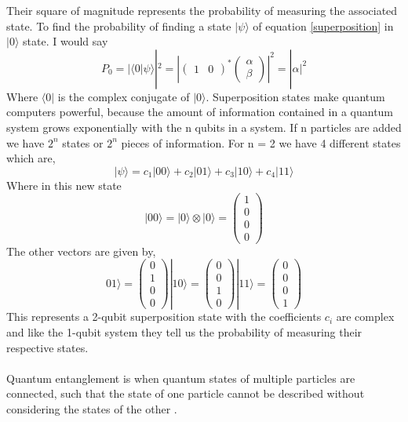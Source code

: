 \documentclass{Assignment}
\begin{document}
Their square of magnitude represents the probability of measuring the associated state.
To find the probability of finding a state $|\psi\rangle$ of equation \eqref{superposition} in $|0\rangle$ state.
I would say
$$P_0=|\langle0|\psi\rangle|^2 = \left| \begin{pmatrix}
	1&0
\end{pmatrix}^*\begin{pmatrix}
	\alpha\\\beta
\end{pmatrix} \right|^2 = |\alpha|^2$$
Where $\langle 0|$ is the complex conjugate of $|0\rangle$.
Superposition states make quantum computers powerful, because the amount of information contained in a quantum system grows exponentially with the n qubits in a system.
If n particles are added we have $2^n$ states or $2^n$ pieces of information. 
For n = 2 we have 4 different states which are,
\begin{equation}
	|\psi\rangle =c_1 |00\rangle+c_2 |01\rangle+c_3 |10\rangle+ c_4 |11\rangle
\end{equation}
Where in this new state \begin{equation}|00\rangle = |0\rangle\otimes|0\rangle  =	\begin{pmatrix}
		1\\0\\0\\0
\end{pmatrix}\end{equation}
The other vectors are given by,
$$01\rangle =	\begin{pmatrix}
	0\\1\\0\\0
\end{pmatrix}|10\rangle =	\begin{pmatrix}
	0\\0\\1\\0
\end{pmatrix}|11\rangle =	\begin{pmatrix}
	0\\0\\0\\1
\end{pmatrix} $$
This represents a 2-qubit superposition state with the coefficients $c_i$ are complex and like the 1-qubit system they tell us the probability of measuring their respective states.
\\\\
Quantum entanglement is when quantum states of multiple particles are connected, such that the state of one particle cannot be described without considering the states of the other \cite{Horodecki_2009}.
\end{document}

